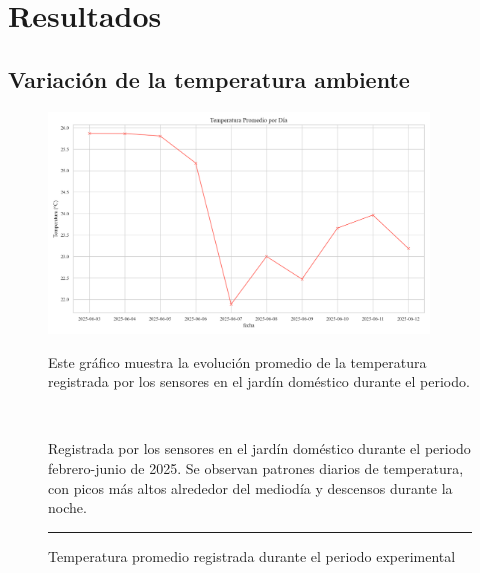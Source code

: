 \documentclass[pdflatex,sn-mathphys-num]{sn-jnl}%
\theoremstyle{thmstyleone}%
\theoremstyle{thmstyletwo}%
\theoremstyle{thmstylethree}%
\begin{document}
\section*{Resultados}\label{sec2}
\subsection*{Variación de la temperatura ambiente}
\begin{figure}[!ht]
    \centering
    \includegraphics[width=0.9\textwidth]{assets/temperatura_promedio.png}
    \caption{Temperatura promedio registrada durante el periodo experimental}
    \label{fig:temperatura}

    \vspace{0.4cm}

    \noindent
    \begin{minipage}[t]{0.5\textwidth}
        \raggedright
        Este gráfico muestra la evolución promedio de la temperatura registrada por los sensores en el jardín doméstico durante el periodo.

        \
    \end{minipage}%
    \hfill
    \begin{minipage}[t]{0.5\textwidth}
        \justifying
        Registrada por los sensores en el jardín doméstico durante el periodo febrero-junio de 2025. Se observan patrones diarios de temperatura, con picos más altos alrededor del mediodía y descensos durante la noche.
    \end{minipage}

    \vspace{0.5cm}
    \hrule
    \label{fig:temperatura_promedio}
\end{figure}
\end{document}
